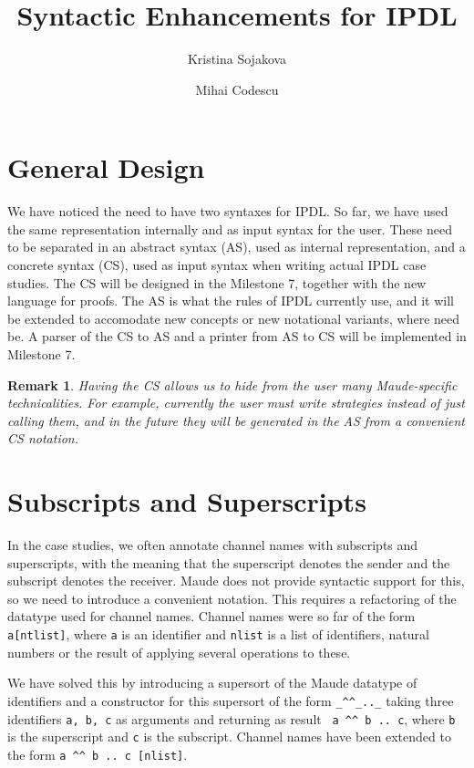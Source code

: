 \documentclass{article}
\title{Syntactic Enhancements for IPDL}
\author{Kristina Sojakova \and Mihai Codescu}
\date{}
\newtheorem{remark}{Remark}
\begin{document}
\maketitle

\section{General Design}

We have noticed the need to have two syntaxes for IPDL. So far, we have used the same representation internally and as input syntax for the user. These need to be separated in an abstract syntax (AS), used as internal
representation, and a concrete syntax (CS), used as input syntax when
writing actual IPDL case studies. The CS will be designed in the Milestone 7, together with the new language for proofs. The AS is what the rules of IPDL currently use, and it will be extended to accomodate new concepts or new notational variants, where need be. A parser of the CS to AS and a printer from AS to CS will be implemented in Milestone 7. 

\begin{remark}
Having the CS allows us to hide from the user many Maude-specific
technicalities. For example, currently the user must write strategies
instead of just calling them, and in the future 
they will be generated in the AS from a
convenient CS notation.
\end{remark}

\section{Subscripts and Superscripts}

In the case studies, we often annotate channel names with subscripts and superscripts, with the meaning that the superscript denotes the sender and the subscript denotes the receiver. Maude does not provide syntactic support for this, so we need to introduce a convenient notation. This requires a
refactoring of the datatype used for channel names. Channel names were so far of the form \verb+a[ntlist]+, where \verb+a+ is an identifier and \verb+nlist+ is a list of identifiers, natural numbers or the result of applying several operations to these.

We have solved this by introducing a supersort of the Maude datatype of identifiers and a constructor for this supersort of the form
\verb+_^^_.._+ taking three identifiers \verb+a, b, c+ as arguments and 
returning as result \verb+ a ^^ b .. c+, where \verb+b+ is the superscript
and \verb+c+ is the subscript. Channel names have been extended to the form
\verb+a ^^ b .. c [nlist]+.
\end{document}
